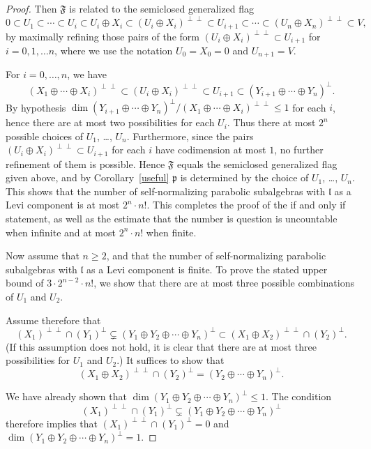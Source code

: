 \documentclass{amsart}
\theoremstyle{definition}
\theoremstyle{remark}
\numberwithin{equation}{section}
\def\l{\mathfrak {l}}
\def\p{\mathfrak {p}}
\def\F{\mathfrak{F}}
\begin{document}
\begin{proof}
Then $\F$ is related to the semiclosed generalized flag
$$0 \subset U_1 \subset \cdots \subset U_i \subset U_i \oplus X_i \subset (U_i \oplus X_i)^{\perp \perp}  \subset U_{i+1} \subset \cdots \subset (U_n \oplus X_n)^{\perp \perp} \subset V,$$
by maximally refining those pairs of the form $(U_i \oplus X_i)^{\perp \perp} \subset U_{i+1}$ for $i = 0, 1, \ldots n$, where we use the notation $U_0 = X_0 = 0$ and $U_{n+1} = V$. 

For $i = 0, \ldots , n$, we have
$$(X_1 \oplus \cdots \oplus X_i)^{\perp \perp} \subset (U_i \oplus X_i)^{\perp \perp} \subset U_{i+1} \subset (Y_{i+1} \oplus \cdots \oplus Y_n)^\perp.$$
By hypothesis $\dim (Y_{i+1} \oplus \cdots \oplus Y_n)^\perp / (X_1 \oplus \cdots \oplus X_i)^{\perp \perp} \leq 1$ for each $i$, hence there are at most two possibilities for each $U_i$.  Thus there at most $2^n$ possible choices of $U_1$, \ldots, $U_n$.  Furthermore, since the pairs $(U_i \oplus X_i)^{\perp \perp} \subset U_{i+1}$ for each $i$ have codimension at most $1$, no further refinement of them is possible.  Hence $\F$ equals the semiclosed generalized flag given above, and by Corollary~\ref{useful} $\p$ is determined by the choice of $U_1$, \ldots, $U_n$.  This shows that the number of self-normalizing parabolic subalgebras with $\l$ as a Levi component is at most $2^n \cdot n!$.  This completes the proof of the if and only if statement, as well as the estimate that the number is question is uncountable when infinite and at most $2^n \cdot n!$ when finite.

Now assume that $n \geq 2$, and that the number of self-normalizing parabolic subalgebras with $\l$ as a Levi component is finite.  To prove the stated upper bound of $3 \cdot 2^{n-2} \cdot n!$, we show that there are at most three possible combinations of $U_1$ and $U_2$.  

Assume therefore that
$$(X_1)^{\perp \perp} \cap (Y_1)^\perp \subsetneq (Y_1 \oplus Y_2 \oplus \cdots \oplus Y_n)^\perp \subset (X_1 \oplus X_2)^{\perp \perp} \cap (Y_2)^\perp.$$
(If this assumption does not hold, it is clear that there are at most three possibilities for $U_1$ and $U_2$.)  It suffices to show that
$$(X_1 \oplus X_2)^{\perp \perp} \cap (Y_2)^\perp = (Y_2 \oplus \cdots \oplus Y_n)^\perp.$$ 

We have already shown that $\dim (Y_1 \oplus Y_2 \oplus \cdots \oplus Y_n)^\perp \leq 1$.  The condition $$(X_1)^{\perp \perp} \cap (Y_1)^\perp \subsetneq (Y_1 \oplus Y_2 \oplus \cdots \oplus Y_n)^\perp$$ therefore implies that $(X_1)^{\perp \perp} \cap (Y_1)^\perp = 0$ and  $\dim (Y_1 \oplus Y_2 \oplus \cdots \oplus Y_n)^\perp = 1$.


\end{proof}
\end{document}
